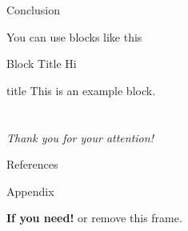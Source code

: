 \documentclass[8pt, aspectratio=169]{beamer} %
\begin{document}
\begin{frame}{Conclusion}

  You can use blocks like this 

  \begin{block}{Block Title}
    Hi
  \end{block}

  \begin{exampleblock}{title}
    This is an example block.
  \end{exampleblock}

\end{frame}

\section{}
\begin{frame}{}
    \centering \Large
    \emph{Thank you for your attention!}
\end{frame}

\begin{frame}[allowframebreaks]{References}

  
  

\end{frame}

\begin{frame}{Appendix}
  
  \textbf{If you need!} or remove this frame.

\end{frame}
\end{document}
